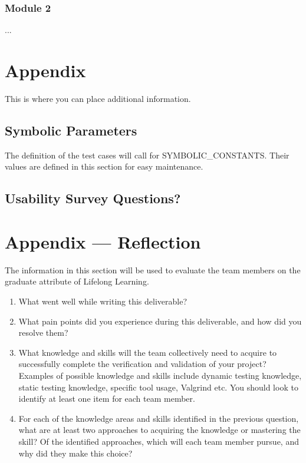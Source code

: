 \documentclass[12pt, titlepage]{article}
\begin{document}
\subsubsection{Module 2}

...
				




\newpage

\section{Appendix}

This is where you can place additional information.

\subsection{Symbolic Parameters}

The definition of the test cases will call for SYMBOLIC\_CONSTANTS.
Their values are defined in this section for easy maintenance.

\subsection{Usability Survey Questions?}


\newpage{}
\section*{Appendix --- Reflection}


The information in this section will be used to evaluate the team members on the
graduate attribute of Lifelong Learning.



\begin{enumerate}
  \item What went well while writing this deliverable? 
  \item What pain points did you experience during this deliverable, and how
    did you resolve them?
  \item What knowledge and skills will the team collectively need to acquire to
  successfully complete the verification and validation of your project?
  Examples of possible knowledge and skills include dynamic testing knowledge,
  static testing knowledge, specific tool usage, Valgrind etc.  You should look to
  identify at least one item for each team member.
  \item For each of the knowledge areas and skills identified in the previous
  question, what are at least two approaches to acquiring the knowledge or
  mastering the skill?  Of the identified approaches, which will each team
  member pursue, and why did they make this choice?
\end{enumerate}
\end{document}
